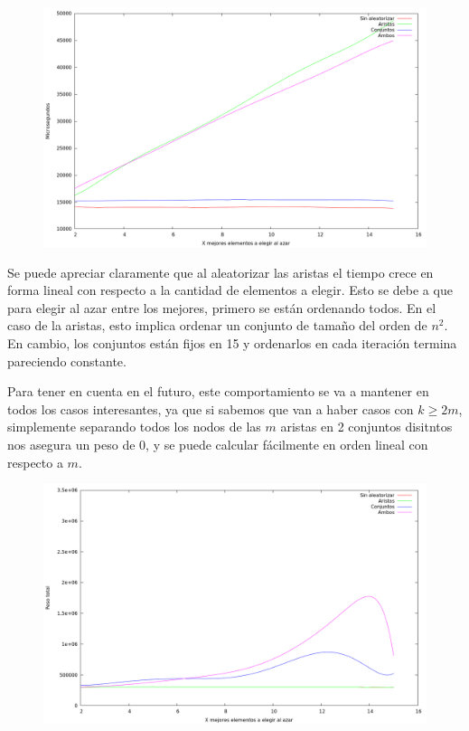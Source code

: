 \begin{figure}[H]
  \begin{center}
    \includegraphics[scale=0.35]{imagenes/grasp-goloso-x-tiempo.png}
  \end{center}
\end{figure}

\vspace*{0.5cm}

Se puede apreciar claramente que al aleatorizar las aristas el tiempo crece
en forma lineal con respecto a la cantidad de elementos a elegir. Esto se debe
a que para elegir al azar entre los mejores, primero se están ordenando todos.
En el caso de la aristas, esto implica ordenar un conjunto de tamaño del orden
de $n^2$. En cambio, los conjuntos están fijos en 15 y ordenarlos en cada
iteración termina pareciendo constante.

Para tener en cuenta en el futuro, este comportamiento se va a mantener en
todos los casos interesantes, ya que si sabemos que van a haber casos con
$k \geq 2m$, simplemente separando todos los nodos de las $m$ aristas en 2
conjuntos disitntos nos asegura un peso de 0, y se puede calcular fácilmente
en orden lineal con respecto a $m$.

\vspace*{0.5cm}

\begin{figure}[H]
  \begin{center}
    \includegraphics[scale=0.35]{imagenes/grasp-goloso-x-peso.png}
  \end{center}
\end{figure}

